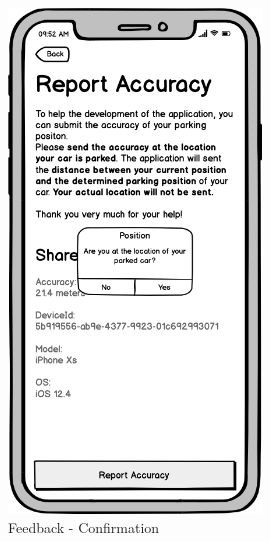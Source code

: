 \begin{figure}[h]
\begin{minipage}[b]{0.49\textwidth}
    \includegraphics[width=0.6\textwidth]{images/UI/Iteration4-Feedback-Confirmation.png}
    \caption{Feedback - Confirmation}
    \label{fig:feedback-con}
  \end{minipage}
  
\end{figure}

